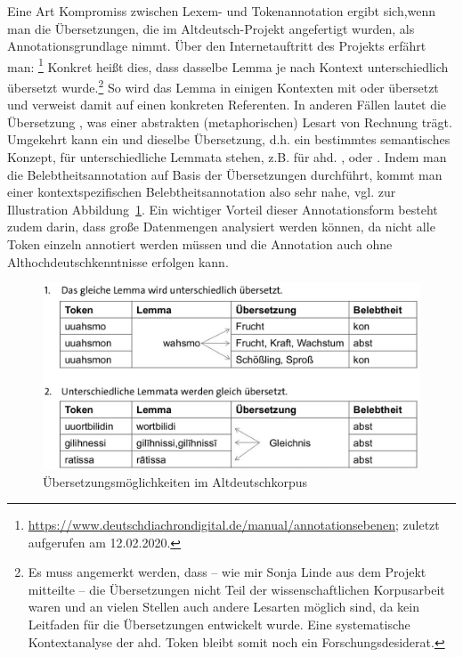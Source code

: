 Eine Art Kompromiss zwischen Lexem- und Tokenannotation ergibt sich,\linebreak wenn man die Übersetzungen, die im Altdeutsch-Projekt angefertigt wurden, als Annotationsgrundlage nimmt.  
Über den Internetauftritt des Projekts erfährt man: \footnote{\url{https://www.deutschdiachrondigital.de/manual/annotationsebenen}; zuletzt aufgerufen am 12.02.2020.} Konkret heißt dies, dass dasselbe Lemma je nach Kontext unterschiedlich übersetzt wurde.\footnote{Es muss angemerkt werden, dass -- wie mir Sonja Linde aus dem Projekt mitteilte -- die Übersetzungen nicht Teil der wissenschaftlichen Korpusarbeit waren und an vielen Stellen auch andere Lesarten möglich sind, da kein Leitfaden für die Übersetzungen entwickelt wurde. Eine systematische Kontextanalyse der ahd. Token bleibt somit noch ein Forschungsdesiderat.} So wird das Lemma  in einigen Kontexten mit  oder  übersetzt und verweist damit auf einen konkreten Referenten. In anderen Fällen lautet die Übersetzung , was einer  abstrakten (metaphorischen) Lesart von  Rechnung trägt. Umgekehrt kann ein und dieselbe Übersetzung, d.h. ein bestimmtes semantisches Konzept, für unterschiedliche Lemmata stehen, z.B.  für ahd. ,  oder . Indem man die Belebtheitsannotation auf Basis der Übersetzungen durchführt, kommt man einer kontextspezifischen Belebtheitsannotation also sehr nahe, vgl. zur Illustration Abbildung~\ref{abb:konzept-ddd}. 
Ein wichtiger Vorteil dieser Annotationsform besteht zudem darin, dass große Datenmengen analysiert werden können, da nicht alle Token einzeln annotiert werden müssen und die Annotation auch ohne Althochdeutschkenntnisse erfolgen kann.


\begin{figure}[h]
\begin{center}
  \includegraphics[width=10 cm]{images/konzept-ddd-sw.jpg}
\caption {Übersetzungsmöglichkeiten im Altdeutschkorpus}
\label{abb:konzept-ddd}
\end{center}
\end{figure} 
 

